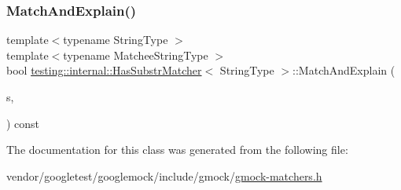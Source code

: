 \subsubsection{\texorpdfstring{Match\+And\+Explain()}{MatchAndExplain()}\hspace{0.1cm}{\footnotesize\ttfamily [2/2]}}
{\footnotesize\ttfamily template$<$typename String\+Type $>$ \\
template$<$typename Matchee\+String\+Type $>$ \\
bool \hyperlink{classtesting_1_1internal_1_1_has_substr_matcher}{testing\+::internal\+::\+Has\+Substr\+Matcher}$<$ String\+Type $>$\+::Match\+And\+Explain (\begin{DoxyParamCaption}\item[{const Matchee\+String\+Type \&}]{s,  }\item[{\hyperlink{classtesting_1_1_match_result_listener}{Match\+Result\+Listener} $\ast$}]{ }\end{DoxyParamCaption}) const\hspace{0.3cm}{\ttfamily [inline]}}



The documentation for this class was generated from the following file\+:\begin{DoxyCompactItemize}
\item 
vendor/googletest/googlemock/include/gmock/\hyperlink{gmock-matchers_8h}{gmock-\/matchers.\+h}\end{DoxyCompactItemize}

